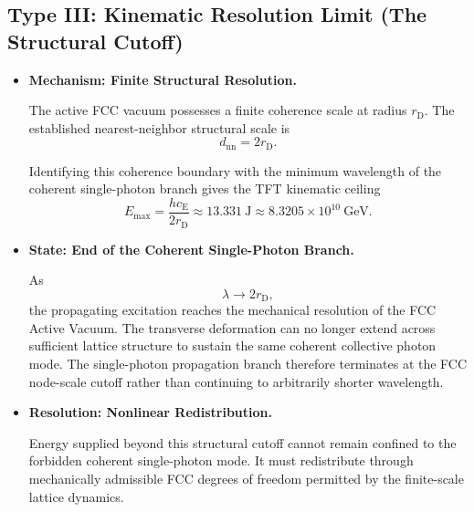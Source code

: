 \subsection{Type III: Kinematic Resolution Limit (The Structural Cutoff)}
\label{sec:nyquist_limit}

\begin{itemize}

    \item \textbf{Mechanism: Finite Structural Resolution.}

    The active FCC vacuum possesses a finite coherence scale at radius $r_{\mathrm D}$. The established nearest-neighbor structural scale is
    \begin{equation}
        d_{\mathrm{nn}}
        =
        2r_{\mathrm D}.
    \end{equation}

    Identifying this coherence boundary with the minimum wavelength of the coherent single-photon branch gives the TFT kinematic ceiling
    \begin{equation}
        E_{\max}
        =
        \frac{
            hc_{\mathrm E}
        }{
            2r_{\mathrm D}
        }
        \approx
        13.331\ \mathrm{J}
        \approx
        8.3205\times10^{10}\ \mathrm{GeV}.
    \end{equation}

    \item \textbf{State: End of the Coherent Single-Photon Branch.}

    As
    \begin{equation}
        \lambda
        \rightarrow
        2r_{\mathrm D},
    \end{equation}
    the propagating excitation reaches the mechanical resolution of the FCC Active Vacuum. The transverse deformation can no longer extend across sufficient lattice structure to sustain the same coherent collective photon mode. The single-photon propagation branch therefore terminates at the FCC node-scale cutoff rather than continuing to arbitrarily shorter wavelength.

    \item \textbf{Resolution: Nonlinear Redistribution.}

    Energy supplied beyond this structural cutoff cannot remain confined to the forbidden coherent single-photon mode. It must redistribute through mechanically admissible FCC degrees of freedom permitted by the finite-scale lattice dynamics.

\end{itemize}



